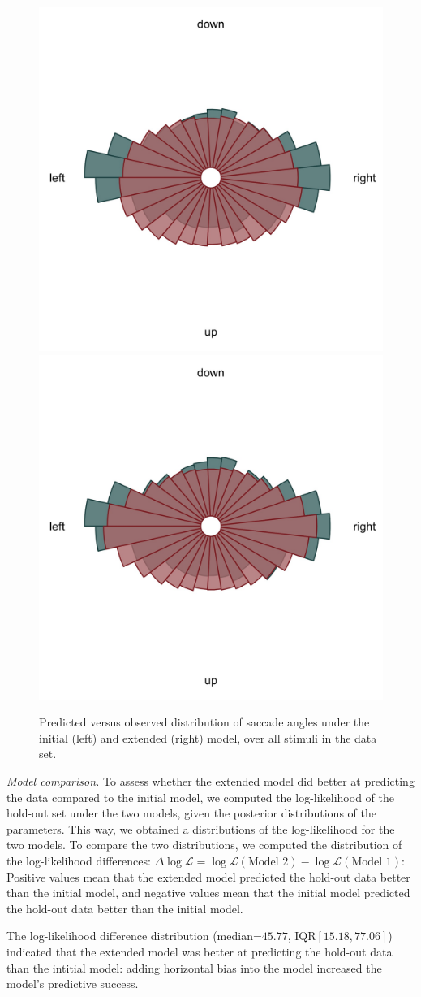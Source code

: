 \documentclass{article}
\begin{document}
\begin{figure}
    \centering
    \includegraphics[width=0.45\linewidth]{figures/fit_model/in_sample/angle.jpg}
    \includegraphics[width=0.45\linewidth]{figures/fit_model_horizontal/in_sample/angle.jpg}
    \caption{Predicted versus observed distribution of saccade angles under the initial (left) and extended (right) model, over all stimuli in the data set.}
    \label{fig:horizontal_comparison}
\end{figure}


\textit{Model comparison.} To assess whether the extended model did better at predicting the data compared to the initial model, we computed the log-likelihood of the hold-out set under the two models, given the posterior distributions of the parameters. This way, we obtained a distributions of the log-likelihood for the two models. To compare the two distributions, we computed the distribution of the log-likelihood differences: $\Delta \log \mathcal{L} = \log \mathcal{L}(\text{Model 2}) - \log \mathcal{L}(\text{Model 1})$: Positive values mean that the extended model predicted the hold-out data better than the initial model, and negative values mean that the initial model predicted the hold-out data better than the initial model.

The log-likelihood difference distribution (median=$45.77$, IQR$[15.18, 77.06]$) indicated that the extended model was better at predicting the hold-out data than the intitial model: adding horizontal bias into the model increased the model's predictive success.
\end{document}
